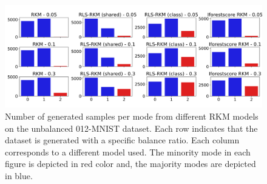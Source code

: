
\begin{figure}[htb]
    \centering
    \includegraphics[width=0.9\linewidth]{Figures/Methods/expr-mnist012-gen-dist.png}
    \caption{Number of generated samples per mode from different RKM models on the unbalanced 012-MNIST dataset. Each row indicates that the dataset is generated with a specific balance ratio. Each column corresponds to a different model used. The minority mode in each figure is depicted in red color and, the majority modes are depicted in blue.}
    \label{fig-rls-gen-dist-ubmnist012}
\end{figure}

